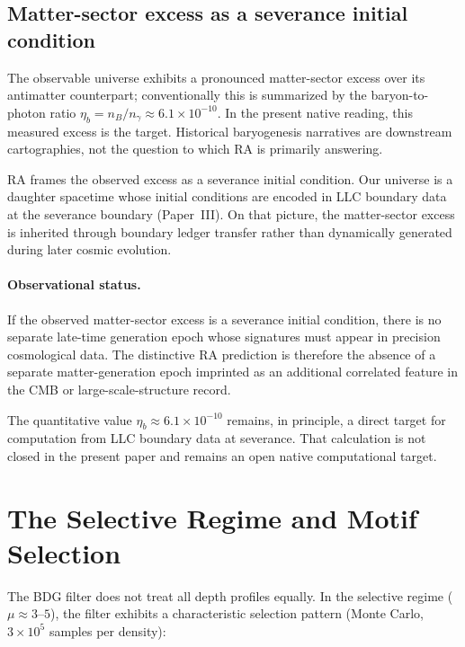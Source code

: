 \documentclass[11pt]{article}
\begin{document}
\subsection{Matter-sector excess as a severance initial condition}

The observable universe exhibits a pronounced matter-sector excess over its antimatter counterpart; conventionally this is summarized by the baryon-to-photon ratio $\eta_b = n_B/n_\gamma \approx 6.1\times 10^{-10}$. In the present native reading, this measured excess is the target. Historical baryogenesis narratives are downstream cartographies, not the question to which RA is primarily answering.

RA frames the observed excess as a severance initial condition. Our universe is a daughter spacetime whose initial conditions are encoded in LLC boundary data at the severance boundary (Paper~III). On that picture, the matter-sector excess is inherited through boundary ledger transfer rather than dynamically generated during later cosmic evolution.

\paragraph{Observational status.} If the observed matter-sector excess is a severance initial condition, there is no separate late-time generation epoch whose signatures must appear in precision cosmological data. The distinctive RA prediction is therefore the absence of a separate matter-generation epoch imprinted as an additional correlated feature in the CMB or large-scale-structure record.

The quantitative value $\eta_b\approx 6.1\times 10^{-10}$ remains, in principle, a direct target for computation from LLC boundary data at severance. That calculation is not closed in the present paper and remains an open native computational target.

\section{The Selective Regime and Motif Selection}
\label{sec:selective}

The BDG filter does not treat all depth profiles equally. In the selective regime ($\mu\approx 3$--$5$), the filter exhibits a characteristic selection pattern (Monte Carlo, $3\times 10^5$ samples per density):
\end{document}
